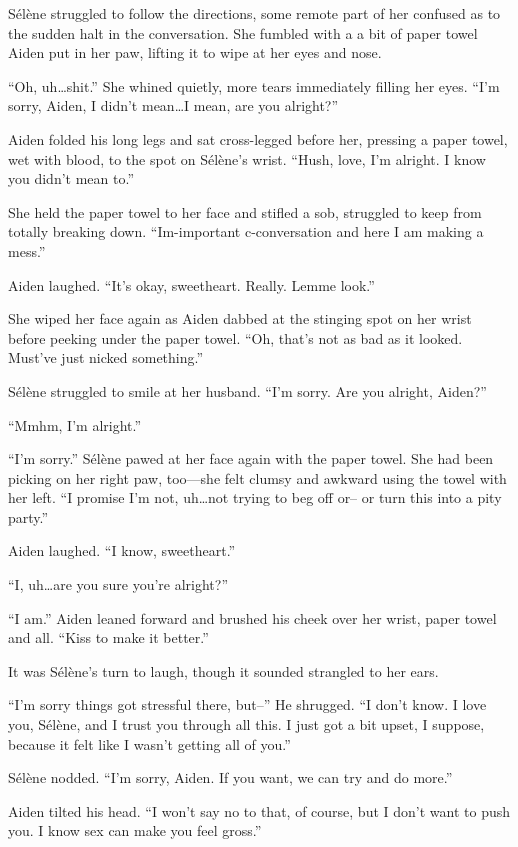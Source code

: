 Sélène struggled to follow the directions, some remote part of her confused as to the sudden halt in the conversation. She fumbled with a a bit of paper towel Aiden put in her paw, lifting it to wipe at her eyes and nose.

``Oh, uh\ldots{}shit.'' She whined quietly, more tears immediately filling her eyes. ``I'm sorry, Aiden, I didn't mean\ldots{}I mean, are you alright?''

Aiden folded his long legs and sat cross-legged before her, pressing a paper towel, wet with blood, to the spot on Sélène's wrist. ``Hush, love, I'm alright. I know you didn't mean to.''

She held the paper towel to her face and stifled a sob, struggled to keep from totally breaking down. ``Im-important c-conversation and here I am making a mess.''

Aiden laughed. ``It's okay, sweetheart. Really. Lemme look.''

She wiped her face again as Aiden dabbed at the stinging spot on her wrist before peeking under the paper towel. ``Oh, that's not as bad as it looked. Must've just nicked something.''

Sélène struggled to smile at her husband. ``I'm sorry. Are you alright, Aiden?''

``Mmhm, I'm alright.''

``I'm sorry.'' Sélène pawed at her face again with the paper towel. She had been picking on her right paw, too---she felt clumsy and awkward using the towel with her left. ``I promise I'm not, uh\ldots{}not trying to beg off or-- or turn this into a pity party.''

Aiden laughed. ``I know, sweetheart.''

``I, uh\ldots{}are you sure you're alright?''

``I am.'' Aiden leaned forward and brushed his cheek over her wrist, paper towel and all. ``Kiss to make it better.''

It was Sélène's turn to laugh, though it sounded strangled to her ears.

``I'm sorry things got stressful there, but--'' He shrugged. ``I don't know. I love you, Sélène, and I trust you through all this. I just got a bit upset, I suppose, because it felt like I wasn't getting all of you.''

Sélène nodded. ``I'm sorry, Aiden. If you want, we can try and do more.''

Aiden tilted his head. ``I won't say no to that, of course, but I don't want to push you. I know sex can make you feel gross.''

